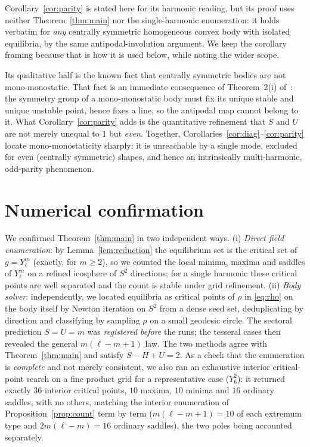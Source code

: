 \documentclass[11pt,a4paper]{article}
\theoremstyle{definition}
\begin{document}
Corollary~\ref{cor:parity} is stated here for its harmonic reading, but its proof uses neither
Theorem~\ref{thm:main} nor the single-harmonic enumeration: it holds verbatim for \emph{any} centrally
symmetric homogeneous convex body with isolated equilibria, by the same antipodal-involution argument. We keep
the corollary framing because that is how it is used below, while noting the wider scope.

Its qualitative half is the known fact that centrally symmetric bodies are not mono-monostatic. That fact is an
immediate consequence of Theorem~2(i) of~\cite{domokos2023symmetry}: the
symmetry group of a mono-monostatic body must fix its unique stable and unique unstable point, hence fixes a
line, so the antipodal map cannot belong to it. What Corollary~\ref{cor:parity} adds is the quantitative
refinement that $S$ and $U$ are not merely unequal to $1$ but \emph{even}. Together,
Corollaries~\ref{cor:diag}--\ref{cor:parity} locate mono-monostaticity sharply: it is unreachable by a single
mode, excluded for even (centrally symmetric) shapes, and hence an intrinsically multi-harmonic,
odd-parity phenomenon.

\section{Numerical confirmation}\label{sec:numerics}

We confirmed Theorem~\ref{thm:main} in two independent ways. (i) \emph{Direct field enumeration}: by
Lemma~\ref{lem:reduction} the equilibrium set is the critical set of $g=Y_\ell^m$ (exactly, for $m\ge2$), so we
counted the local minima, maxima and saddles of $Y_\ell^m$ on a refined icosphere of $S^2$ directions; for a
single harmonic these critical points are well separated and the count is stable under grid refinement. (ii)
\emph{Body solver}: independently, we located equilibria as critical points of $\rho$ in \eqref{eq:rho} on the
body itself by Newton iteration on $S^2$ from a dense seed set, deduplicating by direction and classifying by
sampling $\rho$ on a small geodesic circle. The sectoral prediction $S=U=m$ was \emph{registered before} the
runs; the tesseral cases then revealed the general $m(\ell-m+1)$ law. The two methods agree with
Theorem~\ref{thm:main} and satisfy $S-H+U=2$. As a check that the enumeration is \emph{complete} and not merely
consistent, we also ran an exhaustive interior critical-point search on a fine product grid for a representative
case ($Y_6^2$): it returned exactly $36$ interior critical points, $10$ maxima, $10$ minima and $16$ ordinary
saddles, with no others, matching the interior enumeration of Proposition~\ref{prop:count} term by term
($m(\ell-m+1)=10$ of each extremum type and $2m(\ell-m)=16$ ordinary saddles), the two poles being accounted
separately.
\end{document}
